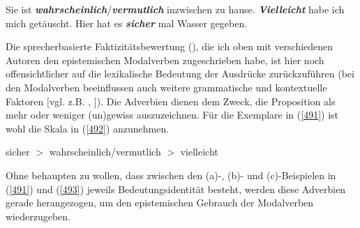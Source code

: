 \begin{exe}
	\ex\label{491} 
		\begin{xlist}	
			\ex\label{491a} Sie ist \textit{\textbf{wahrscheinlich}}/\textit{\textbf{vermutlich}} inzwischen zu hause.
			\newline
			\hbox{}\hfill\hbox {\citet[29]{Diewald1997}}
			\ex\label{491b} \textit{\textbf{Vielleicht}} habe ich mich getäuscht.	
			\hfill\hbox {\citet[278]{Diewald1999b}}
			\ex\label{491c} Hier hat es \textit{\textbf{sicher}} mal Wasser gegeben.
			\hfill\hbox {\citet[67]{Dietrich1992}}			
		\end{xlist}
\end{exe}
Die \glqq sprecherbasierte Faktizitätsbewertung\grqq{} (\citealt[14]{Diewald1999b}), die ich oben mit verschiedenen Autoren den epistemischen Modalverben zugeschrieben habe, ist hier noch offensichtlicher auf die lexikalische Bedeutung der Ausdrücke zurückzuführen (bei den Modalverben beeinflussen auch weitere grammatische und kontextuelle Faktoren $[$vgl. z.B. \citealt[223-229]{Diewald1993}, \citealt[23-33]{Heine1995}$]$). Die Adverbien dienen dem Zweck, die Proposition als mehr oder weniger (un)gewiss auszuzeichnen. Für die Exemplare in (\ref{491}) ist wohl die Skala in (\ref{492}) anzunehmen.

\begin{exe}
	\ex\label{492} 
	sicher $>$ wahrscheinlich/vermutlich $>$ vielleicht
\end{exe}
Ohne behaupten zu wollen, dass zwischen den (a)-, (b)- und (c)-Beispielen in (\ref{491}) und (\ref{493}) jeweils Bedeutungsidentität besteht, werden diese Adverbien gerade herangezogen, um den epistemischen Gebrauch der Modalverben wiederzugeben.

